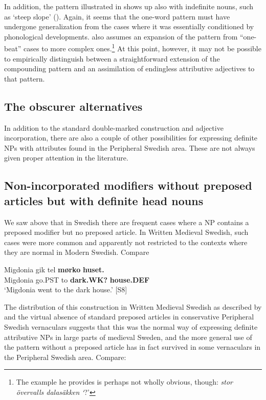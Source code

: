 In addition, the pattern illustrated in  shows up also with indefinite nouns, such as  ‘steep slope’ (\citet[52]{Levander1909}). Again, it seems that the one-word pattern must have undergone generalization from the cases where it was essentially conditioned by phonological developments. \citet[103]{Dahlstedt1962} also assumes an expansion of the pattern from “one-beat” cases to more complex ones.\footnote{ The example he provides is perhaps not wholly obvious, though: \textit{stor övervalls dalasäkken }\textit{‘}?’} At this point, however, it may not be possible to empirically distinguish between a straightforward extension of the compounding pattern and an assimilation of endingless attributive adjectives to that pattern. 

\subsection{The obscurer alternatives}
\label{bkm:Ref105224927}

In addition to the standard double-marked construction and adjective incorporation, there are also a couple of other possibilities for expressing definite NPs with attributes found in the Peripheral Swedish area. These are not always given proper attention in the literature. 

\subsection{Non-incorporated modifiers without preposed articles but with definite head nouns}
\label{bkm:Ref154984033}

We saw above that in Swedish there are frequent cases where a NP contains a preposed modifier but no preposed article. In Written Medieval Swedish, such cases were more common and apparently not restricted to the contexts where they are normal in Modern Swedish. Compare 

\ea\label{}
\gll Migdonia  gik  tel  \textbf{mørko} \textbf{huset.}\\
Migdonia  go.PST  to  \textbf{dark.WK?} \textbf{house.DEF}\\
\glt ‘Migdonia went to the dark house.’ [S8]
\z

The distribution of this construction in Written Medieval Swedish as described by \citet{Larm1936} and the virtual absence of standard preposed articles in conservative Peripheral Swedish vernaculars suggests that this was the normal way of expressing definite attributive NPs in large parts of medieval Sweden, and the more general use of the pattern without a preposed article has in fact survived in some vernaculars in the Peripheral Swedish area. Compare: 


